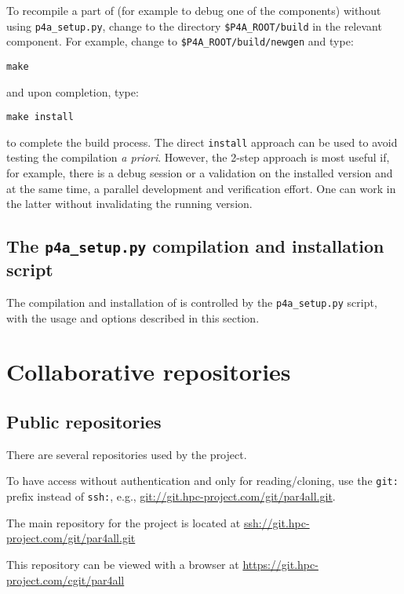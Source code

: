 \documentclass[a4paper]{article}
\begin{document}
To recompile a part of \Apfa (for example to debug
one of the components) without using \verb|p4a_setup.py|, change to
the directory \verb|$P4A_ROOT/build| in the relevant component. For
example, change to \verb|$P4A_ROOT/build/newgen| and type:
\begin{verbatim}
make
\end{verbatim}
and upon completion, type:
\begin{verbatim}
make install
\end{verbatim}
to complete the build process. The direct \texttt{install}
approach can be used to avoid testing the compilation
\emph{a priori}. However, the 2-step
approach is most useful if, for example, there is a debug session or a
validation on the installed version and at the same time, a parallel
development and verification effort. One can work in the latter
without invalidating the running version.

\subsection{The \protect\texttt{p4a\_setup.py} compilation and installation
script}
\label{sec:p4a_s-comp-script}

The compilation and installation of \Apfa is controlled by the
\verb|p4a_setup.py| script, with the usage and options described in
this section.




\section{Collaborative repositories}
\label{sec:coll-repos}


\subsection{Public repositories}
\label{sec:public-repositories}

There are several \Agit repositories used by the project.

To have access without authentication and only for reading/cloning, use
the \texttt{git:} prefix instead of \texttt{ssh:}, e.g.,
\url{git://git.hpc-project.com/git/par4all.git}.

The main repository for the project is located at
\url{ssh://git.hpc-project.com/git/par4all.git}

This repository can be viewed with a \Awww browser at
\url{https://git.hpc-project.com/cgit/par4all}
\end{document}
